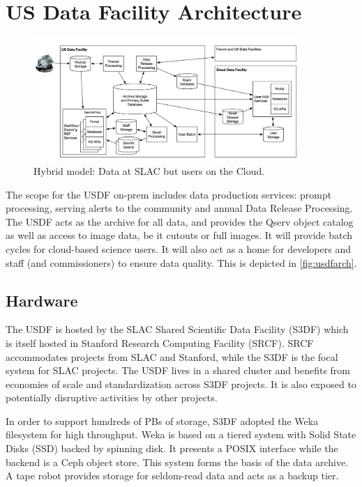 \section {US Data Facility Architecture} \label{sec:usdfarch}


\begin{figure}
\begin{centering}
\includegraphics[width=0.9\textwidth]{hybrid}
	\caption{ Hybrid model: Data at SLAC but users on the Cloud.  \label{fig:usdfarch}}
\end{centering}
\end{figure}

The scope for the USDF on-prem includes data production services:
prompt processing, serving alerts to the community and annual Data
Release Processing. The USDF acts as the archive for all data, and
provides the Qserv object catalog as well as access to image data, be
it cutouts or full images. It will provide batch cycles for cloud-based science users.
It will also act as a home for developers and staff (and
commissioners) to ensure data quality.
This is depicted in \autoref{fig:usdfarch}.


\subsection{Hardware}

The USDF is hosted by the SLAC Shared Scientific Data Facility
(S3DF) which is itself hosted in Stanford Research Computing Facility (SRCF).
SRCF accommodates projects from SLAC and Stanford, while the S3DF is the
focal system for SLAC projects. The USDF lives in a shared cluster and
benefits from economies of scale and standardization across S3DF
projects. It is also exposed to potentially disruptive activities by
other projects.

In order to support hundreds of PBs of storage, S3DF adopted the Weka
filesystem for high throughput. Weka is based on a tiered system with
Solid State Disks (SSD) backed by spinning disk. It presents a POSIX interface while the
backend is a Ceph object store. This system forms the basis of the
data archive. A tape robot provides storage for seldom-read data and
acts as a backup tier.


